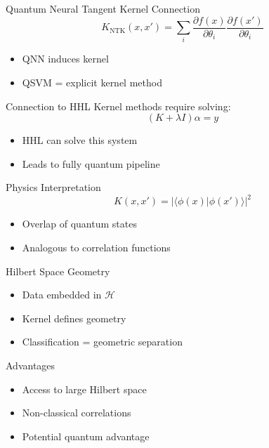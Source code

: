 \documentclass{beamer}
\begin{document}
\begin{frame}{Quantum Neural Tangent Kernel Connection}
\[
K_{\text{NTK}}(x,x') = \sum_i \frac{\partial f(x)}{\partial \theta_i}
\frac{\partial f(x')}{\partial \theta_i}
\]

\begin{itemize}
\item QNN induces kernel
\item QSVM = explicit kernel method
\end{itemize}
\end{frame}

\begin{frame}{Connection to HHL}
Kernel methods require solving:
\[
(K+\lambda I)\alpha = y
\]

\begin{itemize}
\item HHL can solve this system
\item Leads to fully quantum pipeline
\end{itemize}
\end{frame}

\begin{frame}{Physics Interpretation}
\[
K(x,x') = |\langle \phi(x)|\phi(x')\rangle|^2
\]

\begin{itemize}
\item Overlap of quantum states
\item Analogous to correlation functions
\end{itemize}
\end{frame}

\begin{frame}{Hilbert Space Geometry}
\begin{itemize}
\item Data embedded in $\mathcal{H}$
\item Kernel defines geometry
\item Classification = geometric separation
\end{itemize}
\end{frame}

\begin{frame}{Advantages}
\begin{itemize}
\item Access to large Hilbert space
\item Non-classical correlations
\item Potential quantum advantage
\end{itemize}
\end{frame}
\end{document}
